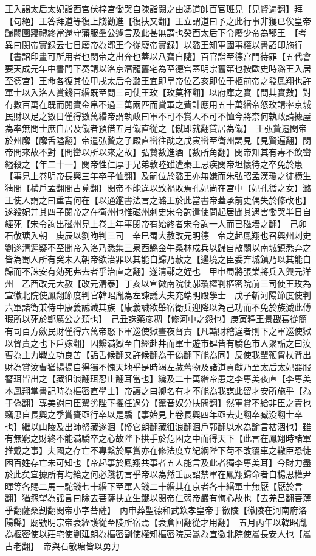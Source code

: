 王入謁太后太妃詣西宮伏梓宫慟哭自陳詣闕之由馮道帥百官班見【見賢遍翻】拜【句絶】王答拜道等復上牋勸進【復扶又翻】王立謂道曰予之此行事非獲已俟皇帝歸闕園寢禮終當還守藩服羣公遽言及此甚無謂也癸酉太后下令廢少帝為鄂王　【考異曰閔帝實録云七日廢帝為鄂王今從廢帝實録】以潞王知軍國事權以書詔印施行【書詔印畫可所用者也閔帝之出奔也蓋以八寶自隨】百官詣至德宫門待罪【五代會要天成元年中書門下奏請以洛京潛龍舊宅為至德宫蓋明宗舊第也按歐史時潞王入居至德宫】王命各復其位甲戌太后令潞王宜即皇帝位乙亥即位于柩前帝之發鳳翔也許軍士以入洛人賞錢百緡既至問三司使王玫【玫莫杯翻】以府庫之實【問其實數】對有數百萬在既而閱實金帛不過三萬兩匹而賞軍之費計應用五十萬緡帝怒玫請率京城民財以足之數日僅得數萬緡帝謂執政曰軍不可不賞人不可不恤今將柰何執政請據屋為率無問士庶自居及僦者預借五月僦直從之【僦即就翻賃居為僦】　王弘䞇遷閔帝於州廨【廨舌隘翻】帝遣弘贄之子殿直巒往酖之戊寅巒至衛州謁見【見賢遍翻】閔帝問來故不對【問巒以所以來之故】弘䞇數進酒【數所角翻】閔帝知其有毒不飲巒縊殺之【年二十一】閔帝性仁厚于兄弟敦睦雖遭秦王忌疾閔帝坦懷待之卒免於患【事見上卷明帝長興三年卒子恤翻】及嗣位於潞王亦無嫌而朱弘昭孟漢瓊之徒横生猜間【横戶孟翻間古莧翻】閔帝不能違以致禍敗焉孔妃尚在宫中【妃孔循之女】潞王使人謂之曰重吉何在【以通鑑書法言之潞王於此當書帝蓋承前史偶失於修改也】遂殺妃并其四子閔帝之在衛州也惟磁州刺史宋令詢遣使問起居聞其遇害慟哭半日自經死【宋令詢出磁州見上卷上年事閔帝有始終者宋令詢一人而已磁墻之翻】　己卯石敬瑭入朝　庚辰以劉昫判三司　辛巳蜀大赦改元明德　帝之起鳳翔也召興州刺史劉遂清遲疑不至聞帝入洛乃悉集三泉西縣金牛桑林戍兵以歸自散關以南城鎮悉弃之皆為蜀人所有癸未入朝帝欲治罪以其能自歸乃赦之【邊境之臣委弃城鎮乃以其能自歸而不誅安有効死弗去者乎治直之翻】遂清鄩之姪也　甲申蜀將張業將兵入興元洋州　乙酉改元大赦【改元清泰】丁亥以宣徽南院使郝瓊權判樞密院前三司使王玫為宣徽北院使鳳翔節度判官韓昭胤為左諫議大夫充端明殿學士　戊子斬河陽節度使判六軍諸衛兼侍中康義誠滅其族【康義誠欲舉宿衛兵迎降以為己功而不免於族滅此傅瑕所以死於鄭厲公之類也】　己丑誅藥彦稠【修河中之怨也】庚寅釋王景戡萇從簡　有司百方斂民財僅得六萬帝怒下軍巡使獄晝夜督責【凡輸財稽違者則下之軍巡使獄以督責之也下戶嫁翻】囚繫滿獄至自經赴井而軍士遊市肆皆有驕色市人聚詬之曰汝曹為主力戰立功良苦【詬舌候翻又許候翻為干偽翻下能為同】反使我輩鞭胷杖背出財為賞汝曹猶揚揚自得獨不愧天地乎是時竭左藏舊物及諸道貢獻乃至太后太妃器服簪珥皆出之【藏徂浪翻珥忍止翻耳當也】纔及二十萬緡帝患之李專美夜直【李專美本鳳翔掌書記時為樞密直學士】帝讓之曰卿名有才不能為我謀此留才安所施乎【為于偽翻】專美謝曰臣駑劣陛下擢任過分【駑音奴分扶問翻】然軍賞不給非臣之責也竊思自長興之季賞賚亟行卒以是驕【事始見上卷長興四年亟去吏翻卒臧没翻士卒也】繼以山陵及出師帑藏遂涸【帑它朗翻藏徂浪翻涸戶郭翻以水為諭言枯涸也】雖有無窮之財終不能滿驕卒之心故陛下拱手於危困之中而得天下【此言在鳳翔時諸軍推戴之事】夫國之存亡不專繫於厚賞亦在修法度立紀綱陛下苟不改覆車之轍臣恐徒困百姓存亡未可知也【帝起事於鳳翔共事者五人能言及此者獨李專美耳】今財力盡於此矣宜據所有均給之何必踐初言乎帝以為然壬辰詔禁軍在鳳翔歸命者自楊思權尹暉等各賜二馬一駝錢七十緡下至軍人錢二十緡其在京者各十緡軍士無厭【厭於言翻】猶怨望為謡言曰除去菩薩扶立生鐵以閔帝仁弱帝嚴有悔心故也【去羌呂翻菩薄乎翻薩桑割翻閔帝小字菩薩】　丙申葬聖德和武欽孝皇帝于徽陵【徽陵在河南府洛陽縣】廟號明宗帝衰絰護從至陵所宿焉【衰倉回翻從才用翻】　五月丙午以韓昭胤為樞密使以莊宅使劉延朗為樞密副使權知樞密院房暠為宣徽北院使暠長安人也【暠古老翻】　帝與石敬瑭皆以勇力